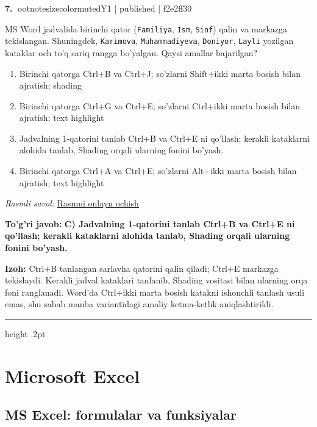 \documentclass[10pt,a4paper]{article}
\begin{document}
\textbf{\color{ink}7.} {ootnotesizecolor{muted}Y1 | published | f2e2ff30}
\par
MS Word jadvalida birinchi qator (\texttt{Familiya}, \texttt{Ism}, \texttt{Sinf}) qalin va markazga tekislangan. Shuningdek, \texttt{Karimova}, \texttt{Muhammadiyeva}, \texttt{Doniyor}, \texttt{Layli} yozilgan kataklar och to'q sariq rangga bo'yalgan. Qaysi amallar bajarilgan?
\begin{enumerate}[label=\Alph*),leftmargin=9mm]
\item Birinchi qatorga Ctrl+B va Ctrl+J; so'zlarni Shift+ikki marta bosish bilan ajratish; shading
\item Birinchi qatorga Ctrl+G va Ctrl+E; so'zlarni Ctrl+ikki marta bosish bilan ajratish; text highlight
\item Jadvalning 1-qatorini tanlab Ctrl+B va Ctrl+E ni qo'llash; kerakli kataklarni alohida tanlab, Shading orqali ularning fonini bo'yash.
\item Birinchi qatorga Ctrl+A va Ctrl+E; so'zlarni Alt+ikki marta bosish bilan ajratish; text highlight
\end{enumerate}
\par\smallskip\textit{Rasmli savol: }\href{https://github.com/sarvar9417/attestatsiya/blob/main/public/kuzgi-demo/demo_q19_wordtable.svg}{Rasmni onlayn ochish}
\begin{tcolorbox}[enhanced,breakable,colback=teal!4,colframe=teal!55!black,boxrule=0.45pt,arc=1.2mm,left=2.8mm,right=2.8mm,top=2mm,bottom=2mm]
\textbf{\color{teal}To'g'ri javob:} \textbf{C) Jadvalning 1-qatorini tanlab Ctrl+B va Ctrl+E ni qo'llash; kerakli kataklarni alohida tanlab, Shading orqali ularning fonini bo'yash.}
\par\smallskip
\textbf{Izoh:} Ctrl+B tanlangan sarlavha qatorini qalin qiladi; Ctrl+E markazga tekislaydi. Kerakli jadval kataklari tanlanib, Shading vositasi bilan ularning orqa foni ranglanadi. Word'da Ctrl+ikki marta bosish katakni ishonchli tanlash usuli emas, shu sabab manba variantidagi amaliy ketma-ketlik aniqlashtirildi.
\end{tcolorbox}
\vspace{2mm}\hrule height .2pt\vspace{2mm}
\section{Microsoft Excel}
\subsection{MS Excel: formulalar va funksiyalar}
\end{document}
